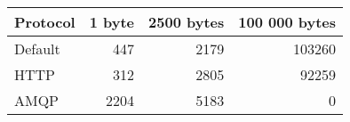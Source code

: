 \begin{tabularx}{\textwidth}{lrrr}
\hline
 Protocol   &   1 byte &   2500 bytes &   100 000 bytes \\
\hline
 Default    &      447 &         2179 &          103260 \\
 HTTP       &      312 &         2805 &           92259 \\
 AMQP       &     2204 &         5183 &               0 \\
\hline
\end{tabularx}